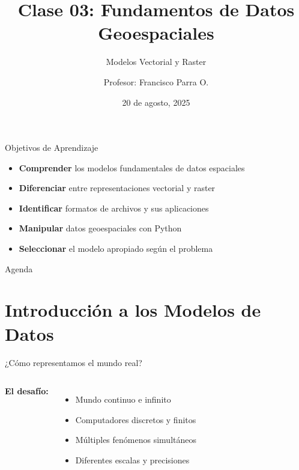 \documentclass[10pt]{beamer}
\title{Clase 03: Fundamentos de Datos Geoespaciales}
\subtitle{Modelos Vectorial y Raster}
\author{Profesor: Francisco Parra O.}
\institute{USACH - Ingeniería Civil en Informática}
\date{20 de agosto, 2025}
\begin{document}
\maketitle

\begin{frame}{Objetivos de Aprendizaje}
    \begin{itemize}
        \item \textbf{Comprender} los modelos fundamentales de datos espaciales
        \item \textbf{Diferenciar} entre representaciones vectorial y raster
        \item \textbf{Identificar} formatos de archivos y sus aplicaciones
        \item \textbf{Manipular} datos geoespaciales con Python
        \item \textbf{Seleccionar} el modelo apropiado según el problema
    \end{itemize}
\end{frame}

\begin{frame}{Agenda}
    \tableofcontents
\end{frame}

\section{Introducción a los Modelos de Datos}

\begin{frame}{¿Cómo representamos el mundo real?}
    \begin{columns}
        \textbf{El desafío:}
        \begin{itemize}
            \item Mundo continuo e infinito
            \item Computadores discretos y finitos
            \item Múltiples fenómenos simultáneos
            \item Diferentes escalas y precisiones
        \end{itemize}
        
    \end{columns}
\end{frame}
\end{document}
